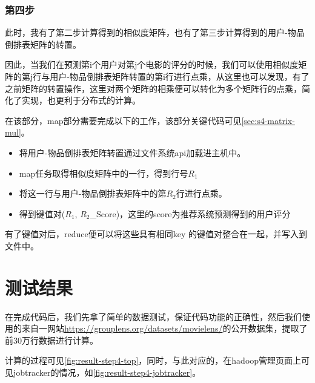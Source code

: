 \documentclass[forprint]{myreport}
\begin{document}
\subsection{第四步}

此时，我有了第二步计算得到的相似度矩阵，也有了第三步计算得到的用户-物品倒排表矩阵的转置。

因此，当我们在预测第i个用户对第j个电影的评分的时候，我们可以使用相似度矩阵的第j行与用户-物品倒排表矩阵转置的第i行进行点乘，从这里也可以发现，有了之前矩阵的转置操作，这里对两个矩阵的相乘便可以转化为多个矩阵行的点乘，简化了实现，也更利于分布式的计算。

在该部分，map部分需要完成以下的工作，该部分关键代码可见\autoref{sec:s4-matrix-mul}。

\begin{itemize}
  \item 将用户-物品倒排表矩阵转置通过文件系统api加载进主机中。
  \item map任务取得相似度矩阵中的一行，得到行号$R_1$
  \item 将这一行与用户-物品倒排表矩阵中的第$R_2$行进行点乘。
  \item 得到键值对($R_1$, $R_2$\_Score)，这里的score为推荐系统预测得到的用户评分
\end{itemize}

有了键值对后，reduce便可以将这些具有相同key 的键值对整合在一起，并写入到文件中。



\chapter{测试结果}

在完成代码后，我们先拿了简单的数据测试，保证代码功能的正确性，然后我们使用的来自一网站\url{https://grouplens.org/datasets/movielens/}的公开数据集，提取了前30万行数据进行计算。

计算的过程可见\autoref{fig:result-step4-top}，同时，与此对应的，在hadoop管理页面上可见jobtracker的情况，如\autoref{fig:result-step4-jobtracker}。
\end{document}
